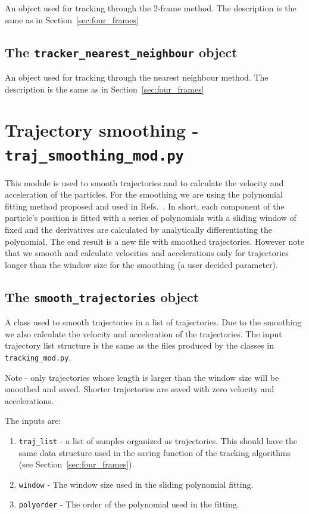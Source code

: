 \documentclass[10pt,a4paper]{article}
\begin{document}
An object used for tracking through the 2-frame method. The description is the same as in Section~\ref{sec:four_frames}



\subsection{The \texttt{tracker\_nearest\_neighbour} object}

An object used for tracking through the nearest neighbour method. The description is the same as in Section~\ref{sec:four_frames}









\section{Trajectory smoothing - \texttt{traj\_smoothing\_mod.py}}

This module is used to smooth trajectories and to calculate the velocity and acceleration of the particles. For the smoothing we are using the polynomial fitting method proposed and used in Refs.~\cite{Luthi2005, Shnapp2019}. In short, each component of the particle's position is fitted with a series of polynomials with a sliding window of fixed  and the derivatives are calculated by analytically differentiating the polynomial. The end result is a new file with smoothed trajectories. However note that we smooth and calculate velocities and accelerations only for trajectories longer than the window size for the smoothing (a user decided parameter). 


\subsection{The \texttt{smooth\_trajectories} object}

A class used to smooth trajectories in a list of trajectories. Due to the smoothing we also calculate the velocity and acceleration of the trajectories. The input trajectory list structure is the same as the files produced by the classes in \texttt{tracking\_mod.py}.

Note - only trajectories whose length is larger than the window size will be smoothed and saved. Shorter trajectories are saved with zero velocity and accelerations.


The inputs are:
\begin{enumerate}
	\item \texttt{traj\_list} -  a list of samples organized as trajectories. This should have the same data structure used in the saving function of the tracking algorithms (see Section~\ref{sec:four_frames}). 
	\item \texttt{window} - The window size used in the sliding polynomial fitting.
	\item \texttt{polyorder} - The order of the polynomial used in the fitting. 
\end{enumerate}
\end{document}
